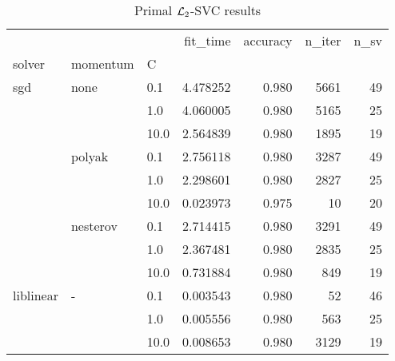 \begin{table}[H]
\centering
\caption{Primal $\protect \mathcal{L}_2$-SVC results}
\label{primal_l2_svc_cv_results}
\begin{tabular}{lllrrrr}
\toprule
          &   &      &  fit\_time &  accuracy &  n\_iter &  n\_sv \\
solver & momentum & C &           &           &         &       \\
\midrule
sgd & none & 0.1  &  4.478252 &     0.980 &    5661 &    49 \\
          &   & 1.0  &  4.060005 &     0.980 &    5165 &    25 \\
          &   & 10.0 &  2.564839 &     0.980 &    1895 &    19 \\
          & polyak & 0.1  &  2.756118 &     0.980 &    3287 &    49 \\
          &   & 1.0  &  2.298601 &     0.980 &    2827 &    25 \\
          &   & 10.0 &  0.023973 &     0.975 &      10 &    20 \\
          & nesterov & 0.1  &  2.714415 &     0.980 &    3291 &    49 \\
          &   & 1.0  &  2.367481 &     0.980 &    2835 &    25 \\
          &   & 10.0 &  0.731884 &     0.980 &     849 &    19 \\
liblinear & - & 0.1  &  0.003543 &     0.980 &      52 &    46 \\
          &   & 1.0  &  0.005556 &     0.980 &     563 &    25 \\
          &   & 10.0 &  0.008653 &     0.980 &    3129 &    19 \\
\bottomrule
\end{tabular}
\end{table}
